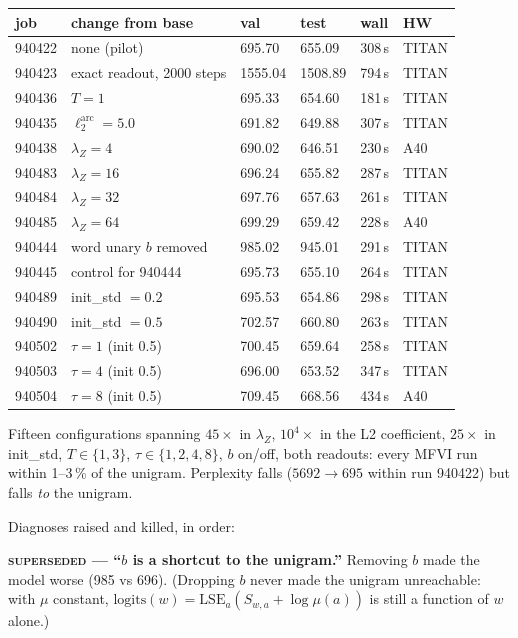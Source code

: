 \documentclass[10pt,a4paper]{article}
\begin{document}
\begin{table}[h]\centering\small
\begin{tabular}{llllll}
\toprule
job & change from base & val & test & wall & HW\\
\midrule
940422 & none (pilot) & 695.70 & 655.09 & 308\,s & TITAN\\
940423 & exact readout, 2000 steps & 1555.04 & 1508.89 & 794\,s & TITAN\\
940436 & $T=1$ & 695.33 & 654.60 & 181\,s & TITAN\\
940435 & $\ell_2^{\mathrm{arc}} = 5.0$ & 691.82 & 649.88 & 307\,s & TITAN\\
940438 & $\lambda_Z = 4$ & 690.02 & 646.51 & 230\,s & A40\\
940483 & $\lambda_Z = 16$ & 696.24 & 655.82 & 287\,s & TITAN\\
940484 & $\lambda_Z = 32$ & 697.76 & 657.63 & 261\,s & TITAN\\
940485 & $\lambda_Z = 64$ & 699.29 & 659.42 & 228\,s & A40\\
940444 & word unary $b$ removed & 985.02 & 945.01 & 291\,s & TITAN\\
940445 & control for 940444 & 695.73 & 655.10 & 264\,s & TITAN\\
940489 & init\_std $= 0.2$ & 695.53 & 654.86 & 298\,s & TITAN\\
940490 & init\_std $= 0.5$ & 702.57 & 660.80 & 263\,s & TITAN\\
940502 & $\tau = 1$ (init 0.5) & 700.45 & 659.64 & 258\,s & TITAN\\
940503 & $\tau = 4$ (init 0.5) & 696.00 & 653.52 & 347\,s & TITAN\\
940504 & $\tau = 8$ (init 0.5) & 709.45 & 668.56 & 434\,s & A40\\
\bottomrule
\end{tabular}
\end{table}

Fifteen configurations spanning $45\times$ in $\lambda_Z$, $10^4\times$ in the L2
coefficient, $25\times$ in init\_std, $T\in\{1,3\}$, $\tau\in\{1,2,4,8\}$, $b$ on/off, both
readouts: every MFVI run within 1--3\,\% of the unigram. Perplexity falls
($5692 \to 695$ within run 940422) but falls \emph{to} the unigram.

Diagnoses raised and killed, in order:

\textbf{\textsc{superseded} --- ``$b$ is a shortcut to the unigram.''} Removing $b$ made the
model worse (985 vs 696). (Dropping $b$ never made the unigram unreachable: with $\mu$
constant, $\mathrm{logits}(w) = \mathrm{LSE}_a(S_{w,a} + \log\mu(a))$ is still a function of
$w$ alone.)
\end{document}
